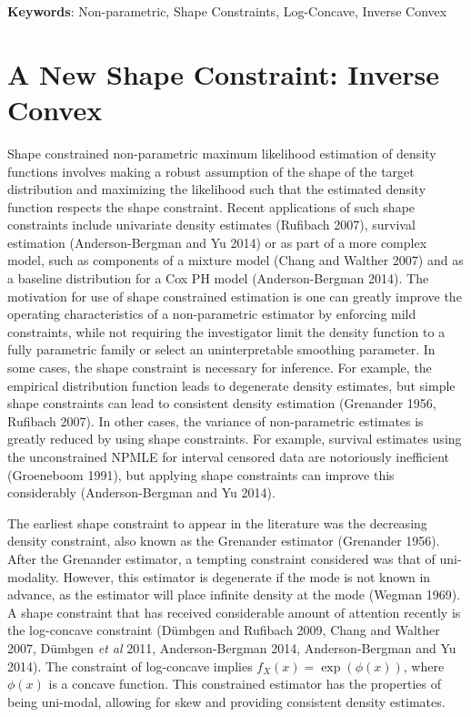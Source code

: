 \documentclass[11pt]{article}
\numberwithin{equation}{section}
\begin{document}
 {\bf Keywords}: Non-parametric, Shape Constraints, Log-Concave, Inverse Convex

{\section{A New Shape Constraint: Inverse Convex} } 

	Shape constrained non-parametric maximum likelihood estimation of density functions involves making a robust assumption of the shape of the target distribution and maximizing the likelihood such that the estimated density function respects the shape constraint. Recent applications of such shape constraints include univariate density estimates (Rufibach 2007), survival estimation (Anderson-Bergman and Yu 2014) or as part of a more complex model, such as components of a mixture model (Chang and Walther 2007) and as a baseline distribution for a Cox PH model (Anderson-Bergman 2014). The motivation for use of  shape constrained estimation is one can greatly improve the operating characteristics of a non-parametric estimator by enforcing mild constraints, while not requiring the investigator limit the density function to a fully parametric family or select an uninterpretable smoothing parameter. In some cases, the shape constraint is necessary for inference. For example, the empirical distribution function leads to degenerate density estimates, but simple shape constraints can lead to consistent density estimation (Grenander 1956, Rufibach 2007). In other cases, the variance of non-parametric estimates is greatly reduced by using shape constraints. For example, survival estimates using the unconstrained NPMLE for interval censored data are notoriously inefficient (Groeneboom 1991), but applying shape constraints can improve this considerably (Anderson-Bergman and Yu  2014). 
			
	The earliest shape constraint to appear in the literature was the decreasing density constraint, also known as the Grenander estimator (Grenander 1956). After the Grenander estimator, a tempting constraint considered was that of uni-modality. However, this estimator is degenerate if the mode is not known in advance, as the estimator will place infinite density at the mode (Wegman 1969). A shape constraint that has received considerable amount of attention recently is the log-concave constraint (D\"umbgen and Rufibach 2009, Chang and Walther 2007, D\"umbgen \emph{et al} 2011, Anderson-Bergman 2014, Anderson-Bergman and Yu 2014). The constraint of log-concave implies $f_X(x) = \exp ( {\phi(x)} )$, where $\phi(x)$ is a concave function. This constrained estimator has the properties of being uni-modal, allowing for skew and providing consistent density estimates. 
	 
\end{document}
